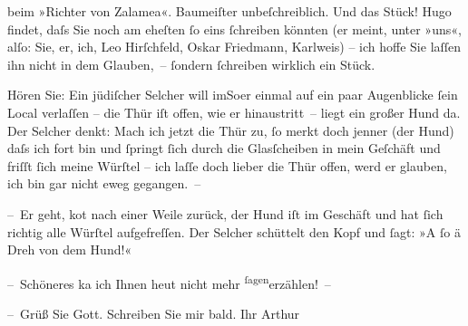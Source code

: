 \pstart
           \label{K_L00921-8v}\label{K_L00921-8} beim »Richter von Zalamea«. Baumeiſter unbeſchreiblich. Und das Stück! Hugo findet, daſs Sie noch am eheſten{ }ſo eins{ }ſchreiben könnten (er meint, unter »uns«, alſo: Sie, er, ich, Leo Hirſchfeld, Oskar
                  Friedmann, Karlweis) – ich hoffe {\pb}Sie laſſen ihn nicht in dem Glauben, –{ }ſondern{ }ſchreiben wirklich ein Stück.\pend
           
\pstart
           Hören Sie: Ein jüdiſcher Selcher will \introOben{}im\introOben{}{ }So{\geminationm}er einmal auf ein
               paar Augenblicke{ }ſein Local verlaſſen – die Thür iſt offen, wie er hinaustritt –
               liegt ein großer Hund da. Der Selcher denkt: Mach ich jetzt die Thür zu,{ }ſo merkt
               doch jenner (der Hund) daſs {\pb}ich fort bin und{ }ſpringt{ }ſich durch die Glasſcheiben in mein Geſchäft und friſſt{ }ſich meine Würſtel – ich
               laſſe doch lieber die Thür offen, werd er glauben, ich bin gar nicht eweg
               gegangen. –\pend
           
\pstart
           – Er geht, ko{\geminationm}t nach einer Weile zurück, der Hund iſt im
               Geschäft und hat{ }ſich richtig alle Würſtel aufgefreſſen. Der Selcher schüttelt {\pb}den Kopf und{ }ſagt: »A{ }ſo ä Dreh von dem Hund!«\pend
           
\pstart
           – Schöneres ka{\geminationn} ich Ihnen heut nicht mehr \substVorne{}\textsuperscript{ſagen}\substDazwischen{}erzählen\substHinten{}! –\pend
           
\pstart
           – Grüß Sie Gott. Schreiben Sie mir bald.\pend
           \pstart Ihr \spacefill\mbox{Arthur}\pend{}\endnumbering{}  \newcommand{\dateiname}{L00921}\newcommand{\titel}{Arthur Schnitzler an Richard Beer-Hofmann, 1. 6. 1899}\newcommand{\editorInnen}{Martin Anton Müller und Gerd-Hermann Susen}

